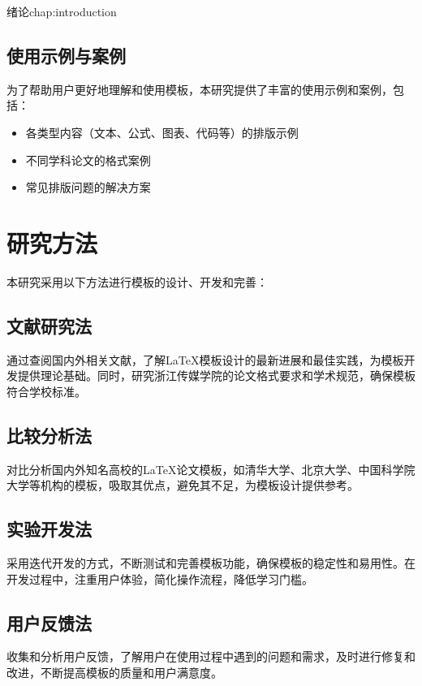 \begin{cuzchapter}{绪论}{chap:introduction}
	\subsection{使用示例与案例}

	为了帮助用户更好地理解和使用模板，本研究提供了丰富的使用示例和案例，包括：

	\begin{itemize}
		\item 各类型内容（文本、公式、图表、代码等）的排版示例
		\item 不同学科论文的格式案例
		\item 常见排版问题的解决方案
	\end{itemize}

	\section{研究方法}\label{sec:method}

	本研究采用以下方法进行模板的设计、开发和完善：

	\subsection{文献研究法}

	通过查阅国内外相关文献，了解\LaTeX{}模板设计的最新进展和最佳实践，为模板开发提供理论基础。同时，研究浙江传媒学院的论文格式要求和学术规范，确保模板符合学校标准。

	\subsection{比较分析法}

	对比分析国内外知名高校的\LaTeX{}论文模板，如清华大学、北京大学、中国科学院大学等机构的模板，吸取其优点，避免其不足，为模板设计提供参考。

	\subsection{实验开发法}

	采用迭代开发的方式，不断测试和完善模板功能，确保模板的稳定性和易用性。在开发过程中，注重用户体验，简化操作流程，降低学习门槛。

	\subsection{用户反馈法}

	收集和分析用户反馈，了解用户在使用过程中遇到的问题和需求，及时进行修复和改进，不断提高模板的质量和用户满意度。


\end{cuzchapter}
